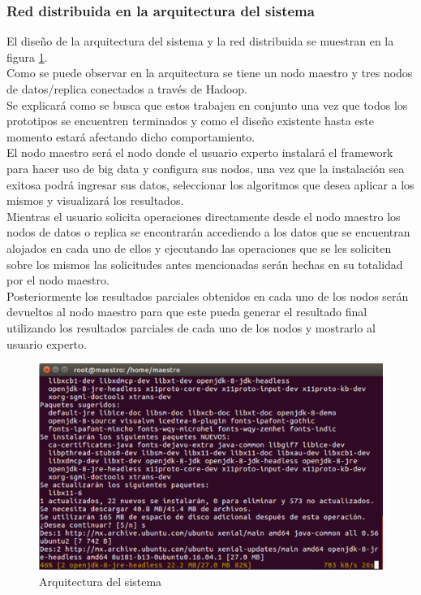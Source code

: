 \subsubsection{Red distribuida en la arquitectura del sistema}
El diseño de la arquitectura del sistema y la red distribuida se muestran en la figura \ref{fig:red}.
\\ 
Como se puede observar en la arquitectura se tiene un nodo maestro y tres nodos de datos/replica conectados a través de Hadoop.
\\
Se explicará como se busca que estos trabajen en conjunto una vez que todos los prototipos se encuentren terminados y como el diseño existente hasta este momento estará afectando dicho comportamiento.
\\
El nodo maestro será el nodo donde el usuario experto instalará el framework para hacer uso de big data y configura sus nodos, una vez que la instalación sea exitosa podrá ingresar sus datos, seleccionar los algoritmos que desea aplicar a los mismos y visualizará los resultados.
\\
Mientras el usuario solicita operaciones directamente desde el nodo maestro los nodos de datos o replica se encontrarán accediendo a los datos que se encuentran alojados en cada
uno de ellos y ejecutando las operaciones que se les soliciten sobre los mismos las solicitudes antes mencionadas serán hechas en su totalidad por el nodo maestro. 
\\
Posteriormente los resultados parciales obtenidos en cada uno de los nodos serán devueltos al nodo maestro para que este pueda generar el resultado final utilizando los resultados parciales de cada uno de los nodos y mostrarlo al usuario experto.

\begin{figure}[!htbp]
	\hypertarget{fig:red}{\hspace{1pt}}
	\begin{center}
		\includegraphics[width=.7\textwidth]{capitulo3/images/im1.png}
		\caption{Arquitectura del sistema}
		\label{fig:red}
	\end{center}
\end{figure}

